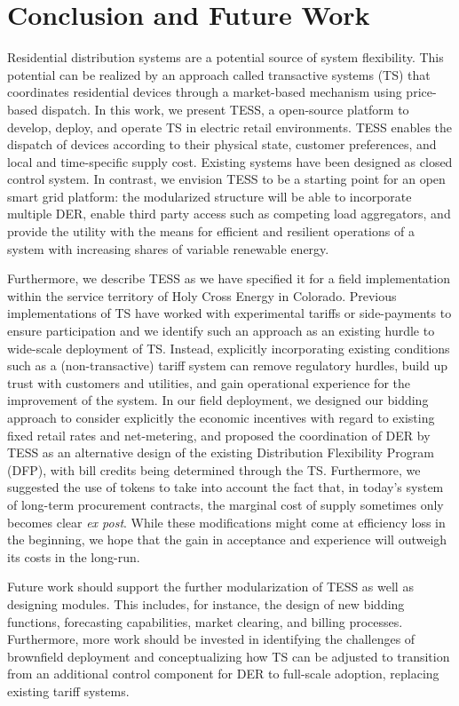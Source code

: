 \section{Conclusion and Future Work}\label{sec:conclusion}

Residential distribution systems are a potential source of system flexibility. This potential can be realized by an approach called transactive systems (TS) that coordinates residential devices through a market-based mechanism using price-based dispatch.
In this work, we present TESS, a open-source platform to develop, deploy, and operate TS in electric retail environments. TESS enables the dispatch of devices according to their physical state, customer preferences, and local and time-specific supply cost. 
Existing systems have been designed as closed control system. In contrast, we envision TESS to be a starting point for an open smart grid platform: the modularized structure will be able to incorporate multiple DER, enable third party access such as competing load aggregators, and provide the utility with the means for efficient and resilient operations of a system with increasing shares of variable renewable energy.

Furthermore, we describe TESS as we have specified it for a field implementation within the service territory of Holy Cross Energy in Colorado.
Previous implementations of TS have worked with experimental tariffs or side-payments to ensure participation and we identify such an approach as an existing hurdle to wide-scale deployment of TS. 
Instead, explicitly incorporating existing conditions such as a (non-transactive) tariff system can remove regulatory hurdles, build up trust with customers and utilities, and gain operational experience for the improvement of the system. 
In our field deployment, we designed our bidding approach to consider explicitly the economic incentives with regard to existing fixed retail rates and net-metering, and proposed the coordination of DER by TESS as an alternative design of the existing Distribution Flexibility Program (DFP), with bill credits being determined through the TS. 
Furthermore, we suggested the use of tokens to take into account the fact that, in today's system of long-term procurement contracts, the marginal cost of supply sometimes only becomes clear \textit{ex post}.
While these modifications might come at efficiency loss in the beginning, we hope that the gain in acceptance and experience will outweigh its costs in the long-run.

Future work should support the further modularization of TESS as well as designing modules. This includes, for instance, the design of new bidding functions, forecasting capabilities, market clearing, and billing processes.
Furthermore, more work should be invested in identifying the challenges of brownfield deployment and conceptualizing how TS can be adjusted to transition from an additional control component for DER to full-scale adoption, replacing existing tariff systems.
